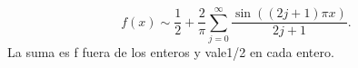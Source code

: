 \[f(x)\sim\frac12+\frac2\pi\sum_{j=0}^\infty\frac{\sin((2j+1)\pi x)}{2j+1}.\]
La suma es f fuera de los enteros y vale1/2 en cada entero.
